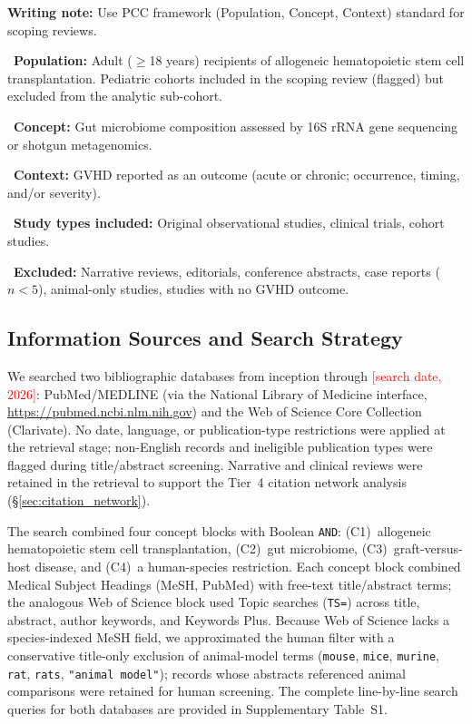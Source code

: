 \documentclass[11pt,a4paper]{article}
\newcommand{\todoitem}[1]{\textcolor{blue!70!black}{\textbullet~#1}}
\newcommand{\writingnote}[1]{\par\noindent\colorbox{yellow!30}{\parbox{\dimexpr\linewidth-2\fboxsep}{%
  \small\textbf{Writing note:} #1}}\par\medskip}
\begin{document}
\writingnote{Use PCC framework (Population, Concept, Context) standard for scoping reviews.}

\todoitem{\textbf{Population:} Adult ($\geq$18 years) recipients of allogeneic hematopoietic stem cell transplantation. Pediatric cohorts included in the scoping review (flagged) but excluded from the analytic sub-cohort.}

\todoitem{\textbf{Concept:} Gut microbiome composition assessed by 16S rRNA gene sequencing or shotgun metagenomics.}

\todoitem{\textbf{Context:} GVHD reported as an outcome (acute or chronic; occurrence, timing, and/or severity).}

\todoitem{\textbf{Study types included:} Original observational studies, clinical trials, cohort studies.}

\todoitem{\textbf{Excluded:} Narrative reviews, editorials, conference abstracts, case reports ($n<5$), animal-only studies, studies with no GVHD outcome.}

\subsection{Information Sources and Search Strategy}
\label{sec:search}

We searched two bibliographic databases from inception through
\textcolor{red}{[search date, 2026]}: PubMed\slash MEDLINE (via the
National Library of Medicine interface,
\url{https://pubmed.ncbi.nlm.nih.gov}) and the Web of Science Core
Collection (Clarivate). No date,
language, or publication-type restrictions were applied at the
retrieval stage; non-English records and ineligible publication types
were flagged during title/abstract screening. Narrative and clinical
reviews were retained in the retrieval to support the Tier~4 citation
network analysis (§\ref{sec:citation_network}).

The search combined four concept blocks with Boolean \texttt{AND}:
(C1)~allogeneic hematopoietic stem cell transplantation, (C2)~gut
microbiome, (C3)~graft-versus-host disease, and (C4)~a human-species
restriction. Each concept block combined Medical Subject Headings
(MeSH, PubMed) with free-text title/abstract terms; the analogous
Web of Science block used Topic searches (\texttt{TS=}) across title,
abstract, author keywords, and Keywords Plus. Because Web of Science
lacks a species-indexed MeSH field, we approximated the human filter
with a conservative title-only exclusion of animal-model terms
(\texttt{mouse}, \texttt{mice}, \texttt{murine}, \texttt{rat},
\texttt{rats}, \texttt{"animal model"}); records whose abstracts
referenced animal comparisons were retained for human screening. The
complete line-by-line search queries for both databases are provided
in Supplementary Table~S1.
\end{document}
